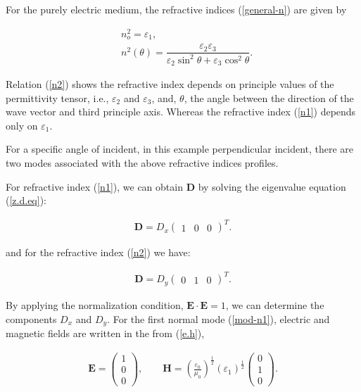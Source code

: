 \documentclass[9pt,twocolumn,twoside]{osajnl}
\begin{document}
For the purely electric medium, the refractive indices (\ref{general-n}) are given by

\begin{eqnarray}
        &n_{o}^2=\varepsilon_{1} \label{n1},\\
        &n^{2}(\theta)=\dfrac{\varepsilon_{2}\varepsilon_{3}}{\varepsilon_{2}\sin^{2}{\theta}+\varepsilon_{3}\cos^{2}{\theta}} \label{n2}.
\end{eqnarray}    

Relation (\ref{n2}) shows the refractive index depends on principle values of the permittivity tensor, i.e., $\varepsilon_{2}$ and $\varepsilon_{3}$, and, $\theta$, the angle between the direction of the wave vector and third principle axis. Whereas the refractive index (\ref{n1})  depends only on $\varepsilon_{1}$.

For a specific angle of incident, in this example perpendicular incident, there are two modes associated with the above refractive indices profiles. 

For refractive index (\ref{n1}), we can obtain $\mathbf{D}$ by solving the eigenvalue equation (\ref{z.d.eq}):

\begin{align} \label{mod-n1}
        \mathbf{D}=D_{x}
         \begin{pmatrix}
            1 &0&0
         \end{pmatrix}^{T}.    
\end{align}

and for the refractive index (\ref{n2}) we have:

 \begin{eqnarray}\label{mod-n2}
  \mathbf{D}=D_{y}
\begin{pmatrix}
0&1&0
\end{pmatrix}^{T}.
 \end{eqnarray}
 
By applying the normalization condition, $\mathbf{E}\cdot \mathbf{E}=1$, we can determine the components $D_{x} $ and $D_{y} $. 
For the first normal mode (\ref{mod-n1}), electric and magnetic fields are written in the from (\ref{e.h}),

\begin{align}\label{field-n1}
\mathbf{E}=
         \begin{pmatrix}
             1\\0\\0
         \end{pmatrix},
        \qquad
         \mathbf{H}=\left(\frac{\varepsilon_{0}}{\mu_{0}}\right)^{\frac{1}{2}}(\varepsilon_{1})^{\frac{1}{2}}
         \begin{pmatrix}
            0\\1\\0
        \end{pmatrix}.
\end{align}
\end{document}

